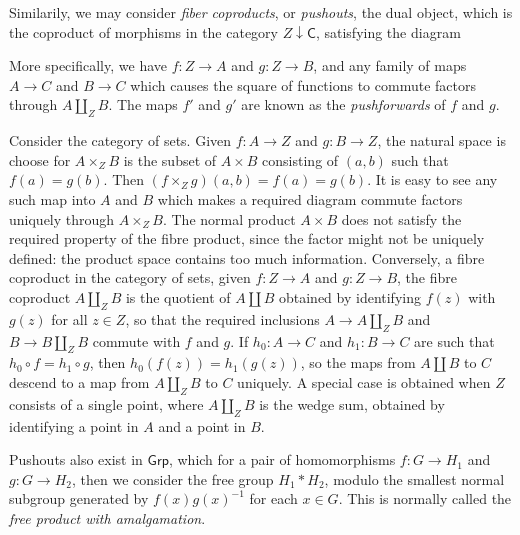 Similarily, we may consider \emph{fiber coproducts}, or \emph{pushouts}, the dual object, which is the coproduct of morphisms in the category $Z \downarrow \mathsf{C}$, satisfying the diagram
%
\begin{center}
\end{center}
%
More specifically, we have $f: Z \to A$ and $g: Z \to B$, and any family of maps $A \to C$ and $B \to C$ which causes the square of functions to commute factors through $A \coprod_Z B$. The maps $f'$ and $g'$ are known as the \emph{pushforwards} of $f$ and $g$.

\begin{example}
    Consider the category of sets. Given $f: A \to Z$ and $g: B \to Z$, the natural space is choose for $A \times_Z B$ is the subset of $A \times B$ consisting of $(a,b)$ such that $f(a) = g(b)$. Then $(f \times_Z g)(a,b) = f(a) = g(b)$. It is easy to see any such map into $A$ and $B$ which makes a required diagram commute factors uniquely through $A \times_Z B$. The normal product $A \times B$ does not satisfy the required property of the fibre product, since the factor might not be uniquely defined: the product space contains too much information. Conversely, a fibre coproduct in the category of sets, given $f: Z \to A$ and $g: Z \to B$, the fibre coproduct $A \coprod_Z B$ is the quotient of $A \coprod B$ obtained by identifying $f(z)$ with $g(z)$ for all $z \in Z$, so that the required inclusions $A \to A \coprod_Z B$ and $B \to B \coprod_Z B$ commute with $f$ and $g$. If $h_0: A \to C$ and $h_1: B \to C$ are such that $h_0 \circ f = h_1 \circ g$, then $h_0(f(z)) = h_1(g(z))$, so the maps from $A \coprod B$ to $C$ descend to a map from $A \coprod_Z B$ to $C$ uniquely. A special case is obtained when $Z$ consists of a single point, where $A \coprod_Z B$ is the wedge sum, obtained by identifying a point in $A$ and a point in $B$.
\end{example}

\begin{example}
    Pushouts also exist in $\mathsf{Grp}$, which for a pair of homomorphisms $f: G \to H_1$ and $g: G \to H_2$, then we consider the free group $H_1 * H_2$, modulo the smallest normal subgroup generated by $f(x) g(x)^{-1}$ for each $x \in G$. This is normally called the \emph{free product with amalgamation}.
\end{example}

